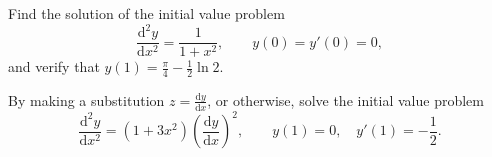 \documentclass[answers]{exam}
\begin{document}
\begin{questions}
\question%
Find the solution of the initial value problem \[
	\frac{\mathrm d^2y}{\mathrm dx^2}=\frac 1{1+x^2},\qquad
	y(0)=y'(0)=0,
\] and verify that $\displaystyle y(1)=\frac\pi4-\frac12\ln2$.



\question%
By making a substitution $z=\frac{\mathrm dy}{\mathrm dx}$, or otherwise, solve the initial value problem \[
	\frac{\mathrm d^2y}{\mathrm dx^2}=(1+3x^2)\left(\frac{\mathrm dy}{\mathrm dx}\right)^2,\qquad
	y(1)=0,\quad
	y'(1)=-\frac12.
\]

\end{questions}
\end{document}
